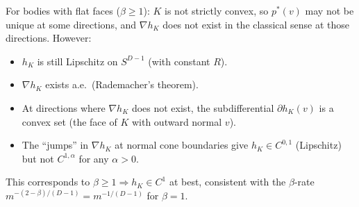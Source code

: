 \begin{remark}
For bodies with flat faces ($\beta \geq 1$): $K$ is not strictly convex, so $p^*(v)$ may not be unique at some directions, and $\nabla h_K$ does not exist in the classical sense at those directions. However:
\begin{itemize}
  \item $h_K$ is still Lipschitz on $S^{D-1}$ (with constant $R$).
  \item $\nabla h_K$ exists a.e.\ (Rademacher's theorem).
  \item At directions where $\nabla h_K$ does not exist, the subdifferential $\partial h_K(v)$ is a convex set (the face of $K$ with outward normal $v$).
  \item The ``jumps'' in $\nabla h_K$ at normal cone boundaries give $h_K \in C^{0,1}$ (Lipschitz) but not $C^{1,\alpha}$ for any $\alpha > 0$.
\end{itemize}
This corresponds to $\beta \geq 1 \Rightarrow h_K \in C^1$ at best, consistent with the $\beta$-rate $m^{-(2-\beta)/(D-1)} = m^{-1/(D-1)}$ for $\beta = 1$.
\end{remark}
